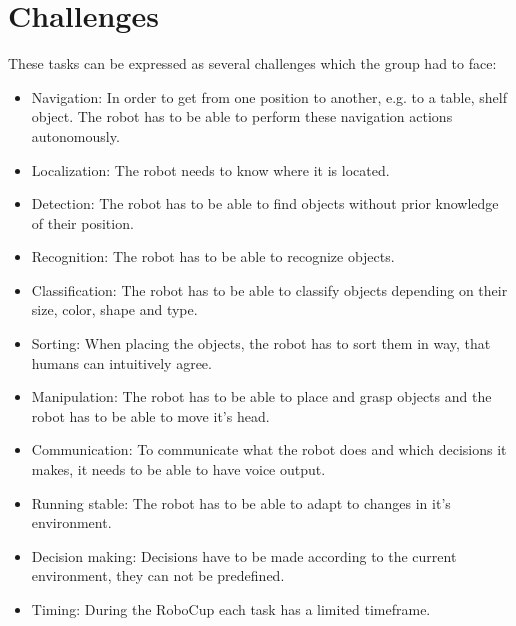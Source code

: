 \documentclass[main.tex]{subfiles}
\begin{document}
	\section{Challenges}
	\label{challanges}
	These tasks can be expressed as several challenges which the group had to face:
	\begin{itemize}
		\item Navigation: In order to get from one position to another, e.g. to a table, shelf object. The robot has to be able to perform these navigation actions autonomously. 
		\item Localization: The robot needs to know where it is located.
		\item Detection: The robot has to be able to find objects without prior knowledge of their position.
		\item Recognition: The robot has to be able to recognize objects.
		\item Classification: The robot has to be able to classify objects depending on their size, color, shape and type.
		\item Sorting: When placing the objects, the robot has to sort them in way, that humans can intuitively agree.
		\item Manipulation: The robot has to be able to place and grasp objects and the robot has to be able to move it's head.
		\item Communication: To communicate what the robot does and which decisions it makes, it needs to be able to have voice output.
		\item Running stable: The robot has to be able to adapt to changes in it's environment.
		\item Decision making: Decisions have to be made according to the current environment, they can not be predefined. 
		\item Timing: During the RoboCup each task has a limited timeframe.
		
	\end{itemize}
\end{document}
